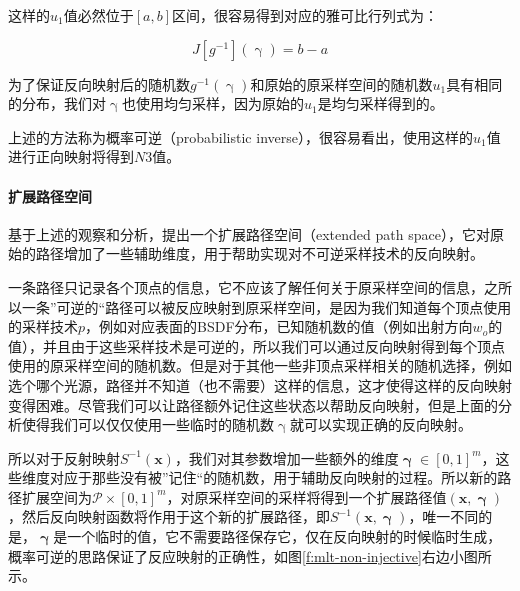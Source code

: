 \noindent 这样的$u_1$值必然位于$[a,b]$区间，很容易得到对应的雅可比行列式为：

\begin{equation}\label{e:mlt-intervals-2}
	J[g^{-1}](\upgamma)=b-a
\end{equation}

\noindent 为了保证反向映射后的随机数$g^{-1}(\upgamma)$和原始的原采样空间的随机数$u_1$具有相同的分布，我们对$\upgamma$也使用均匀采样，因为原始的$u_1$是均匀采样得到的。

上述的方法称为概率可逆（probabilistic inverse），很容易看出，使用这样的$u_1$值进行正向映射将得到$N3$值。




\paragraph{扩展路径空间}
基于上述的观察和分析，\cite{a:ReversibleJumpMetropolisLightTransportusingInverseMappings}提出一个扩展路径空间（extended path space），它对原始的路径增加了一些辅助维度，用于帮助实现对不可逆采样技术的反向映射。

一条路径只记录各个顶点的信息，它不应该了解任何关于原采样空间的信息，之所以一条”可逆的“路径可以被反应映射到原采样空间，是因为我们知道每个顶点使用的采样技术$p$，例如对应表面的BSDF分布，已知随机数的值（例如出射方向$w_o$的值），并且由于这些采样技术是可逆的，所以我们可以通过反向映射得到每个顶点使用的原采样空间的随机数。但是对于其他一些非顶点采样相关的随机选择，例如选个哪个光源，路径并不知道（也不需要）这样的信息，这才使得这样的反向映射变得困难。尽管我们可以让路径额外记住这些状态以帮助反向映射，但是上面的分析使得我们可以仅仅使用一些临时的随机数$\upgamma$就可以实现正确的反向映射。

所以对于反射映射$S^{-1}({\mathbf{x}})$，我们对其参数增加一些额外的维度${\mathbf{\upgamma}}\in[0,1]^{m}$，这些维度对应于那些没有被”记住“的随机数，用于辅助反向映射的过程。所以新的路径扩展空间为$\mathcal{P}\times[0,1]^{m}$，对原采样空间的采样将得到一个扩展路径值$({\mathbf{x}},{\mathbf{\upgamma}})$，然后反向映射函数将作用于这个新的扩展路径，即$S^{-1}({\mathbf{x}},{\mathbf{\upgamma}})$，唯一不同的是，${\mathbf{\upgamma}}$是一个临时的值，它不需要路径保存它，仅在反向映射的时候临时生成，概率可逆的思路保证了反应映射的正确性，如图\ref{f:mlt-non-injective}右边小图所示。

